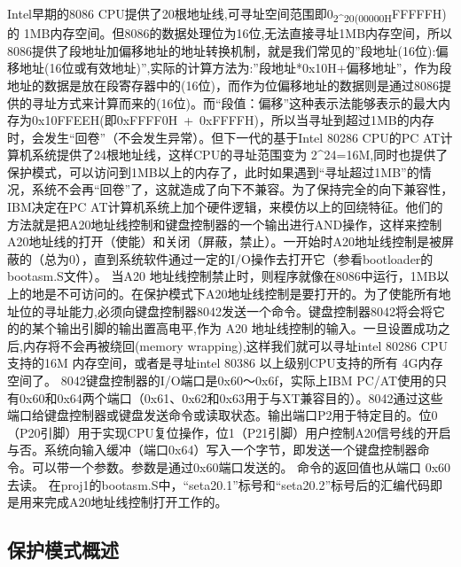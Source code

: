 Intel早期的8086
CPU提供了20根地址线,可寻址空间范围即0\textsubscript{2\^{}20(00000H}FFFFFH)的
1MB内存空间。但8086的数据处理位为16位,无法直接寻址1MB内存空间，所以8086提供了段地址加偏移地址的地址转换机制，就是我们常见的''段地址(16位):偏移地址(16位或有效地址)'',实际的计算方法为:''段地址*0x10H+偏移地址''，作为段地址的数据是放在段寄存器中的(16位)，而作为位偏移地址的数据则是通过8086提供的寻址方式来计算而来的(16位)。而``段值：偏移''这种表示法能够表示的最大内存为0x10FFEEH(即0xFFFF0H~+~0xFFFFH)，所以当寻址到超过1MB的内存时，会发生``回卷''（不会发生异常）。但下一代的基于Intel
80286 CPU的PC AT计算机系统提供了24根地址线，这样CPU的寻址范围变为
2\^{}24=16M,同时也提供了保护模式，可以访问到1MB以上的内存了，此时如果遇到``寻址超过1MB''的情况，系统不会再``回卷''了，这就造成了向下不兼容。为了保持完全的向下兼容性，IBM决定在PC
AT计算机系统上加个硬件逻辑，来模仿以上的回绕特征。他们的方法就是把A20地址线控制和键盘控制器的一个输出进行AND操作，这样来控制A20地址线的打开（使能）和关闭（屏蔽，禁止）。一开始时A20地址线控制是被屏蔽的（总为0），直到系统软件通过一定的I/O操作去打开它（参看bootloader的bootasm.S文件）。
当A20
地址线控制禁止时，则程序就像在8086中运行，1MB以上的地是不可访问的。在保护模式下A20地址线控制是要打开的。为了使能所有地址位的寻址能力,必须向键盘控制器8042发送一个命令。键盘控制器8042将会将它的的某个输出引脚的输出置高电平,作为
A20 地址线控制的输入。一旦设置成功之后,内存将不会再被绕回(memory
wrapping),这样我们就可以寻址intel 80286 CPU支持的16M
内存空间，或者是寻址intel 80386 以上级别CPU支持的所有 4G内存空间了。
8042键盘控制器的I/O端口是0x60～0x6f，实际上IBM
PC/AT使用的只有0x60和0x64两个端口（0x61、0x62和0x63用于与XT兼容目的）。8042通过这些端口给键盘控制器或键盘发送命令或读取状态。输出端口P2用于特定目的。位0（P20引脚）用于实现CPU复位操作，位1（P21引脚）用户控制A20信号线的开启与否。系统向输入缓冲（端口0x64）写入一个字节，即发送一个键盘控制器命令。可以带一个参数。参数是通过0x60端口发送的。
命令的返回值也从端口 0x60去读。
在proj1的bootasm.S中，``seta20.1''标号和``seta20.2''标号后的汇编代码即是用来完成A20地址线控制打开工作的。

\subsection{保护模式概述}\label{ux4fddux62a4ux6a21ux5f0fux6982ux8ff0}

